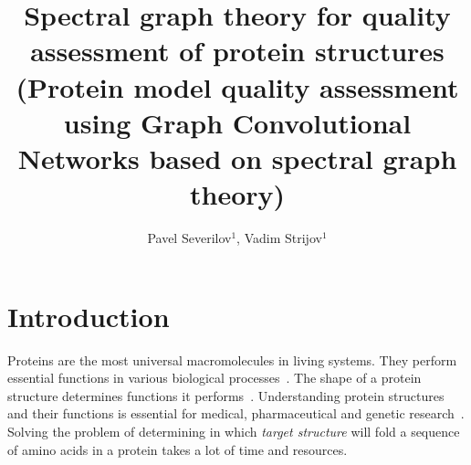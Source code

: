 \documentclass[12pt,twosides]{extarticle}
\title
[under review]
{Spectral graph theory for quality assessment of protein structures
	(Protein model quality assessment using Graph Convolutional Networks based on spectral graph theory)}
\author
[Severilov~P.A.] 
{Pavel Severilov$^1$, Vadim Strijov$^1$}
\begin{document}
	\maketitle
	
\section{Introduction}

Proteins are the most universal macromolecules in living systems. They perform essential functions in various biological processes~\cite{berg2002biochemistry}. The shape of a protein structure determines functions it performs~\cite{berg2002biochemistry}. Understanding protein structures and their functions is essential for medical, pharmaceutical and genetic research~\cite{Baldassarre2019GraphQAPM}. Solving the problem of determining in which \textit{target structure} will fold a sequence of amino acids in a protein takes a lot of time and resources.
\end{document}

